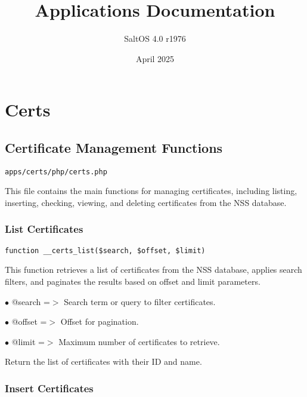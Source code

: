 \documentclass[a4paper]{article}
\title{Applications Documentation}
\author{SaltOS 4.0 r1976}
\begin{document}
\date{April 2025}
\maketitle
\clearpage

\tableofcontents
\clearpage


\hypertarget{toc1}{}
\section{Certs}

\hypertarget{toc2}{}
\subsection{Certificate Management Functions}

\begin{lstlisting}
apps/certs/php/certs.php
\end{lstlisting}

This file contains the main functions for managing certificates, including listing,
inserting, checking, viewing, and deleting certificates from the NSS database.

\hypertarget{toc3}{}
\subsubsection{List Certificates}

\begin{lstlisting}
function __certs_list($search, $offset, $limit)
\end{lstlisting}

This function retrieves a list of certificates from the NSS database, applies search filters,
and paginates the results based on offset and limit parameters.

\begin{compactitem}
\item[\color{myblue}$\bullet$] @search =$>$ Search term or query to filter certificates.
\item[\color{myblue}$\bullet$] @offset =$>$ Offset for pagination.
\item[\color{myblue}$\bullet$] @limit  =$>$ Maximum number of certificates to retrieve.
\end{compactitem}

Return the list of certificates with their ID and name.

\hypertarget{toc4}{}
\subsubsection{Insert Certificates}
\end{document}
